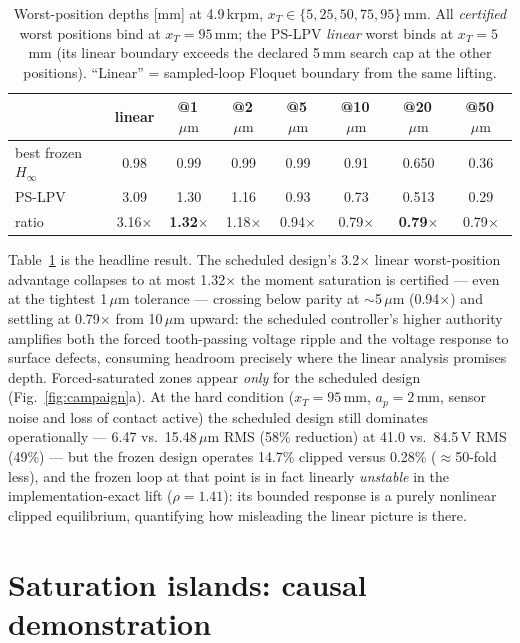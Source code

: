 \documentclass[preprint,12pt]{elsarticle}
\newcommand{\hinf}{\ensuremath{H_\infty}}
\newcommand{\um}{\,\ensuremath{\mu\mathrm{m}}}
\begin{document}
\begin{table}[htbp]
\centering\small
\caption{Worst-position depths [mm] at 4.9\,krpm,
$x_T\in\{5,25,50,75,95\}$\,mm. All \emph{certified} worst positions
bind at $x_T=95$\,mm; the PS-LPV \emph{linear} worst binds at
$x_T=5$\,mm (its linear boundary exceeds the declared 5\,mm search
cap at the other positions). ``Linear'' = sampled-loop Floquet
boundary from the same lifting.}
\label{tab:ranking}
\begin{tabular}{lccccccc}
\toprule
 & linear & @1\um & @2\um & @5\um & @10\um & @20\um & @50\um \\
\midrule
best frozen \hinf & 0.98 & 0.99 & 0.99 & 0.99 & 0.91 & 0.650 & 0.36\\
PS-LPV            & 3.09 & 1.30 & 1.16 & 0.93 & 0.73 & 0.513 & 0.29\\
ratio             & 3.16$\times$ & \textbf{1.32$\times$} &
1.18$\times$ & 0.94$\times$ & 0.79$\times$ &
\textbf{0.79$\times$} & 0.79$\times$ \\
\bottomrule
\end{tabular}
\end{table}

Table~\ref{tab:ranking} is the headline result. The scheduled
design's 3.2$\times$ linear worst-position advantage collapses to at
most 1.32$\times$ the moment saturation is certified --- even at the
tightest 1\um{} tolerance --- crossing below parity at $\sim$5\um{}
(0.94$\times$) and settling at 0.79$\times$ from 10\um{} upward: the
scheduled controller's higher authority
amplifies both the forced tooth-passing voltage ripple and the
voltage response to surface defects, consuming headroom precisely
where the linear analysis promises depth. Forced-saturated zones
appear \emph{only} for the scheduled design
(Fig.~\ref{fig:campaign}a). At the hard condition ($x_T=95$\,mm,
$a_p=2$\,mm, sensor noise and loss of contact active) the scheduled
design still dominates operationally --- 6.47 vs.\ 15.48\um{} RMS
(58\% reduction) at 41.0 vs.\ 84.5\,V RMS (49\%) --- but the frozen
design operates 14.7\% clipped versus 0.28\%
($\approx$50-fold less), and the frozen loop at that point is in fact
linearly \emph{unstable} in the implementation-exact lift
($\rho=1.41$): its bounded response is a purely nonlinear clipped
equilibrium, quantifying how misleading the linear picture is there.

\section{Saturation islands: causal demonstration}
\label{sec:islands}
\end{document}
